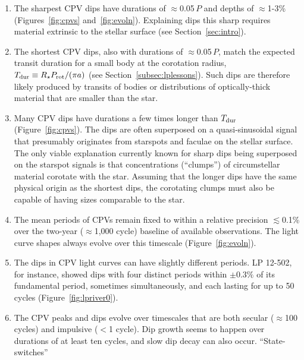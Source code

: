 \documentclass[11pt,twocolumn,tighten]{aastex63}
\begin{document}
\vspace{-2pt}
\begin{enumerate}[leftmargin=*]
	  \setlength\itemsep{-2pt}
%
    \item The sharpest CPV dips have durations of $\approx$0.05\,$P$
      and depths of $\approx$1-3\% (Figures~\ref{fig:cpvs}
      and~\ref{fig:evoln}).  Explaining dips this sharp requires
      material extrinsic to the stellar surface (see
      Section~\ref{sec:intro}).
%
    \item The shortest CPV dips, also with durations of
      $\approx$0.05\,$P$, match the expected transit duration for a
      small body at the corotation radius, $T_{\rm dur} \equiv R_\star
      P_{\rm rot} / (\pi a)$ (see Section~\ref{subsec:lplessons}).
      Such dips are therefore likely produced by transits of bodies or
      distributions of optically-thick material that are smaller than
      the star.
%
    \item Many CPV dips have durations a few times longer than $T_{\rm
      dur}$ (Figure~\ref{fig:cpvs}).  The dips are often superposed on
      a quasi-sinusoidal signal that presumably originates from
      starspots and faculae on the stellar surface.  The only viable
      explanation currently known for sharp dips being superposed on
      the starspot signals is that concentrations (``clumps'') of
      circumstellar material corotate with the star.  Assuming that
      the longer dips have the same physical origin as the shortest
      dips, the corotating clumps must also be capable of having sizes
      comparable to the star.
%
    \item The mean periods of CPVs remain fixed to within a relative
      precision $\lesssim$0.1\% over the two-year ($\approx$1{,}000
      cycle) baseline of available observations.  The light curve
      shapes always evolve over this timescale
      (Figure~\ref{fig:evoln}).
%
    \item The dips in CPV light curves can have slightly different
      periods.  LP 12-502, for instance, showed dips with four
      distinct periods within $\pm 0.3\%$ of its fundamental period,
      sometimes simultaneously, and each lasting for up to 50 cycles
      (Figure~\ref{fig:lpriver0}).
%
    \item The CPV peaks and dips evolve over timescales that are both
      secular ($\approx$100\,cycles) and impulsive ($<$1 cycle).  Dip
      growth seems to happen over durations of at least ten cycles,
      and slow dip decay can also occur.  ``State-switches''

\end{enumerate}
\end{document}
